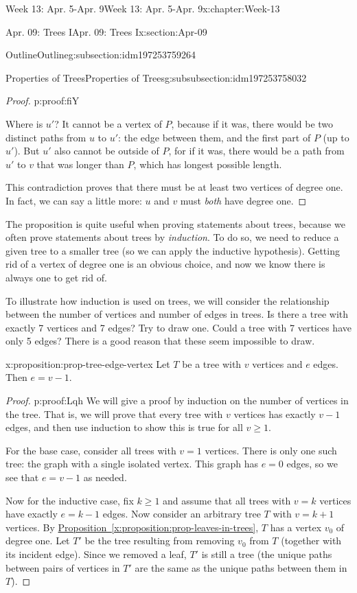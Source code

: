 \documentclass[oneside,10pt,]{book}
\newcommand{\xreffont}{\relax}
\numberwithin{equation}{section}
\renewcommand{\ge}{\geqslant}
\begin{document}
\begin{chapterptx}{Week 13: Apr. 5-Apr. 9}{}{Week 13: Apr. 5-Apr. 9}{}{}{x:chapter:Week-13}
\begin{sectionptx}{Apr. 09: Trees I}{}{Apr. 09: Trees I}{}{}{x:section:Apr-09}
\begin{subsectionptx}{Outline}{}{Outline}{}{}{g:subsection:idm197253759264}
\begin{subsubsectionptx}{Properties of Trees}{}{Properties of Trees}{}{}{g:subsubsection:idm197253758032}
\begin{proof}{}{p:proof:fiY}
\par
Where is \(u'\)?  It cannot be a vertex of \(P\), because if it was, there would be two distinct paths from \(u\) to \(u'\): the edge between them, and the first part of \(P\) (up to \(u'\)).  But \(u'\) also cannot be outside of \(P\), for if it was, there would be a path from \(u'\) to \(v\) that was longer than \(P\), which has longest possible length.%
\par
This contradiction proves that there must be at least two vertices of degree one.  In fact, we can say a little more: \(u\) and \(v\) must \emph{both} have degree one.%
\end{proof}
The proposition is quite useful when proving statements about trees, because we often prove statements about trees by \emph{induction}.  To do so, we need to reduce a given tree to a smaller tree (so we can apply the inductive hypothesis).  Getting rid of a vertex of degree one is an obvious choice, and now we know there is always one to get rid of.%
\par
To illustrate how induction is used on trees, we will consider the relationship between the number of vertices and number of edges in trees.  Is there a tree with exactly 7 vertices and 7 edges?  Try to draw one.  Could a tree with 7 vertices have only 5 edges?  There is a good reason that these seem impossible to draw.%
\begin{proposition}{}{}{x:proposition:prop-tree-edge-vertex}%
%
Let \(T\) be a tree with \(v\) vertices and \(e\) edges.  Then \(e = v-1\).%
\end{proposition}
\begin{proof}{}{p:proof:Lqh}
We will give a proof by induction on the number of vertices in the tree.  That is, we will prove that every tree with \(v\) vertices has exactly \(v-1\) edges, and then use induction to show this is true for all \(v \ge 1\).%
\par
For the base case, consider all trees with \(v = 1\) vertices.  There is only one such tree: the graph with a single isolated vertex.  This graph has \(e = 0\) edges, so we see that \(e = v-1\) as needed.%
\par
Now for the inductive case, fix \(k \ge 1\) and assume that all trees with \(v=k\) vertices have exactly \(e=k-1\) edges.  Now consider an arbitrary tree \(T\) with \(v = k+1\) vertices.  By \hyperref[x:proposition:prop-leaves-in-trees]{Proposition~{\xreffont\ref{x:proposition:prop-leaves-in-trees}}}, \(T\) has a vertex \(v_0\) of degree one.  Let \(T'\) be the tree resulting from removing \(v_0\) from \(T\) (together with its incident edge).  Since we removed a leaf, \(T'\) is still a tree (the unique paths between pairs of vertices in \(T'\) are the same as the unique paths between them in \(T\)).%

\end{proof}
\end{subsubsectionptx}
\end{subsectionptx}
\end{sectionptx}
\end{chapterptx}
\end{document}
